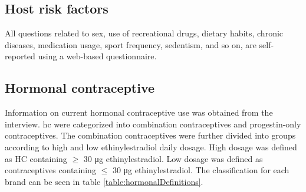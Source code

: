 \subsection{Host risk factors}

All questions related to sex, use of recreational drugs, dietary habits, chronic diseases, medication usage, sport frequency, sedentism, and so on, are self-reported using a web-based questionnaire.

\subsection{Hormonal contraceptive}

Information on current hormonal contraceptive use was obtained from the interview. \gls{hc} were categorized into combination contraceptives and progestin-only contraceptives. The combination contraceptives were further divided into groups according to high and low ethinylestradiol daily dosage. High dosage was defined as HC containing $\geq$ 30 μg ethinylestradiol. Low dosage was defined as contraceptives containing $\leq$ 30 μg ethinylestradiol. The classification for each brand can be seen in table \ref{table:hormonalDefinitions}.

